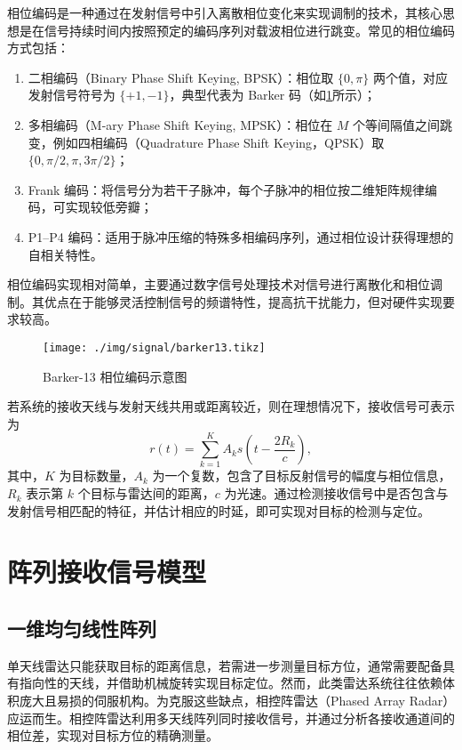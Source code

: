 相位编码是一种通过在发射信号中引入离散相位变化来实现调制的技术，其核心思想是在信号持续时间内按照预定的编码序列对载波相位进行跳变。常见的相位编码方式包括：
\begin{enumerate}
    \item 二相编码（Binary Phase Shift Keying, BPSK）：相位取 $\{0, \pi\}$ 两个值，对应发射信号符号为 $\{+1, -1\}$，典型代表为 Barker 码（如\cref{fig_barker}所示）；
    \item 多相编码（M-ary Phase Shift Keying, MPSK）：相位在 $M$ 个等间隔值之间跳变，例如四相编码（Quadrature Phase Shift Keying，QPSK）取 $\{0, \pi/2, \pi, 3\pi/2\}$；
    \item Frank 编码：将信号分为若干子脉冲，每个子脉冲的相位按二维矩阵规律编码，可实现较低旁瓣；
    \item P1--P4 编码：适用于脉冲压缩的特殊多相编码序列，通过相位设计获得理想的自相关特性。
\end{enumerate}
相位编码实现相对简单，主要通过数字信号处理技术对信号进行离散化和相位调制。其优点在于能够灵活控制信号的频谱特性，提高抗干扰能力，但对硬件实现要求较高。

\begin{figure}[htb!]
    \centering
    \texttt{[image: ./img/signal/barker13.tikz]}
    \caption{Barker-13 相位编码示意图}
    \label{fig_barker}
\end{figure}

若系统的接收天线与发射天线共用或距离较近，则在理想情况下，接收信号可表示为
\[
    r(t) = \sum_{k=1}^{K} A_k s\left(t - \frac{2 R_k}{c}\right),
\]
其中，$K$ 为目标数量，$A_k$ 为一个复数，包含了目标反射信号的幅度与相位信息，$R_k$ 表示第 $k$ 个目标与雷达间的距离，$c$ 为光速。通过检测接收信号中是否包含与发射信号相匹配的特征，并估计相应的时延，即可实现对目标的检测与定位。

\section{阵列接收信号模型}

\subsection{一维均匀线性阵列}
单天线雷达只能获取目标的距离信息，若需进一步测量目标方位，通常需要配备具有指向性的天线，并借助机械旋转实现目标定位。然而，此类雷达系统往往依赖体积庞大且易损的伺服机构。为克服这些缺点，相控阵雷达（Phased Array Radar）应运而生。相控阵雷达利用多天线阵列同时接收信号，并通过分析各接收通道间的相位差，实现对目标方位的精确测量。

